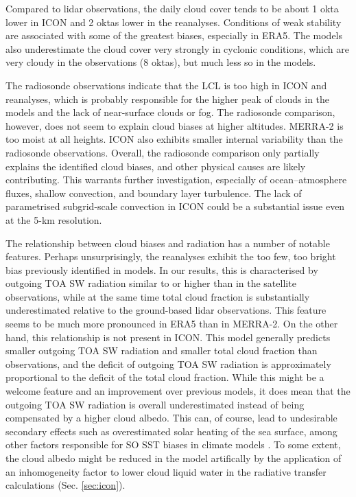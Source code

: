 \documentclass[draft]{agujournal2019}
\begin{document}
Compared to lidar observations, the daily cloud cover tends to be about 1 okta
lower in ICON and 2 oktas lower in the reanalyses.  Conditions of weak
stability are associated with some of the greatest biases, especially in ERA5.
The models also underestimate the cloud cover very strongly in cyclonic
conditions, which are very cloudy in the observations (8 oktas), but much less
so in the models.

The radiosonde observations indicate that the LCL is too high in ICON and
reanalyses, which is probably responsible for the higher peak of clouds in the
models and the lack of near-surface clouds or fog. The radiosonde comparison,
however, does not seem to explain cloud biases at higher altitudes.  MERRA-2 is
too moist at all heights.  ICON also exhibits smaller internal variability than
the radiosonde observations. Overall, the radiosonde comparison only partially
explains the identified cloud biases, and other physical causes are likely
contributing.  This warrants further investigation, especially of
ocean--atmosphere fluxes, shallow convection, and boundary layer turbulence.
The lack of parametrised subgrid-scale convection in ICON could be a
substantial issue even at the 5-km resolution.

The relationship between cloud biases and radiation has a number of notable
features. Perhaps unsurprisingly, the reanalyses exhibit the too few, too
bright bias previously identified in models. In our results, this is
characterised by outgoing TOA SW radiation similar to or higher than in the
satellite observations, while at the same time total cloud fraction is
substantially underestimated relative to the ground-based lidar observations.
This feature seems to be much more pronounced in ERA5 than in MERRA-2. On the
other hand, this relationship is not present in ICON. This model generally
predicts smaller outgoing TOA SW radiation and smaller total cloud fraction
than observations, and the deficit of outgoing TOA SW radiation is
approximately proportional to the deficit of the total cloud fraction. While
this might be a welcome feature and an improvement over previous models, it
does mean that the outgoing TOA SW radiation is overall underestimated instead
of being compensated by a higher cloud albedo.  This can, of course, lead to
undesirable secondary effects such as overestimated solar heating of the sea
surface, among other factors responsible for SO SST biases in climate models
.  To some extent, the cloud albedo might be
reduced in the model artifically by the application of an inhomogeneity factor
to lower cloud liquid water in the radiative transfer calculations (Sec.
\ref{sec:icon}).
\end{document}
